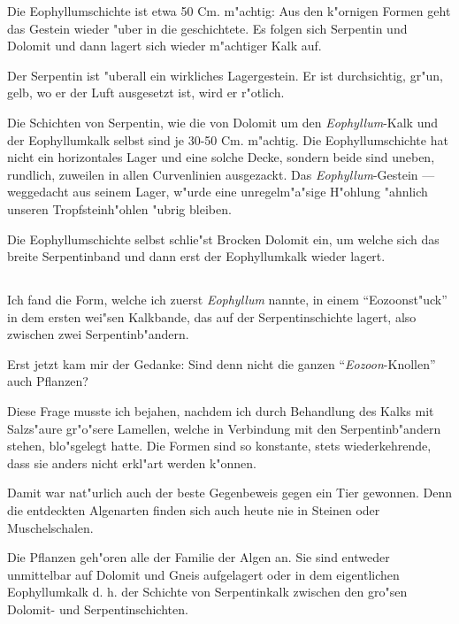 \documentclass[a4paper, 11pt, oneside, german]{article}
\begin{document}
Die Eophyllumschichte ist etwa 50 Cm. m"achtig: Aus den k"ornigen Formen geht das Gestein wieder "uber in die geschichtete. Es folgen sich Serpentin und Dolomit und dann lagert sich wieder m"achtiger Kalk auf.

Der Serpentin ist "uberall ein wirkliches Lagergestein. Er ist durchsichtig, gr"un, gelb, wo er der Luft ausgesetzt ist, wird er r"otlich.

Die Schichten von Serpentin, wie die von Dolomit um den \emph{Eophyllum}-Kalk und der Eophyllumkalk selbst sind je 30-50 Cm. m"achtig. Die Eophyllumschichte hat nicht ein horizontales Lager und eine solche Decke, sondern beide sind uneben, rundlich, zuweilen in allen Curvenlinien ausgezackt. Das \emph{Eophyllum}-Gestein --- weggedacht aus seinem Lager, w"urde eine unregelm"a"sige H"ohlung "ahnlich unseren Tropfsteinh"ohlen "ubrig bleiben.

Die Eophyllumschichte selbst schlie"st Brocken Dolomit ein, um welche sich das breite Serpentinband und dann erst der Eophyllumkalk wieder lagert.
\clearpage
\subsection{}
\paragraph{}
Ich fand die Form, welche ich zuerst \emph{Eophyllum} nannte, in einem "`Eozoonst"uck"' in dem ersten wei"sen Kalkbande, das auf der Serpentinschichte lagert, also zwischen zwei Serpentinb"andern.

Erst jetzt kam mir der Gedanke: Sind denn nicht die ganzen "`\emph{Eozoon}-Knollen"' auch Pflanzen?

Diese Frage musste ich bejahen, nachdem ich durch Behandlung des Kalks mit Salzs"aure gr"o"sere Lamellen, welche in Verbindung mit den Serpentinb"andern stehen, blo"sgelegt hatte. Die Formen sind so konstante, stets wiederkehrende, dass sie anders nicht erkl"art werden k"onnen.

Damit war nat"urlich auch der beste Gegenbeweis gegen ein Tier gewonnen. Denn die entdeckten Algenarten finden sich auch heute nie in Steinen oder Muschelschalen.

Die Pflanzen geh"oren alle der Familie der Algen an. Sie sind entweder unmittelbar auf Dolomit und Gneis aufgelagert oder in dem eigentlichen Eophyllumkalk d. h. der Schichte von Serpentinkalk zwischen den gro"sen Dolomit- und Serpentinschichten.
\end{document}
